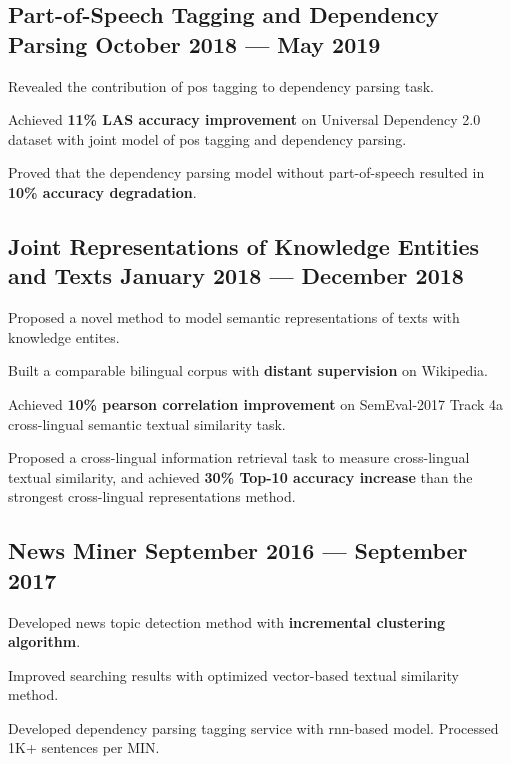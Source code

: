 \subsection*{Part-of-Speech Tagging and Dependency Parsing \hfill October 2018 --- May 2019} 
    \begin{zitemize}
        \item Revealed the contribution of pos tagging to dependency parsing task.
        \item Achieved \textbf{11\% LAS accuracy improvement} on Universal Dependency 2.0 dataset with joint model of pos tagging and dependency parsing.
        \item Proved that the dependency parsing model without part-of-speech resulted in \textbf{10\% accuracy degradation}.
    \end{zitemize}


\subsection*{Joint Representations of Knowledge Entities and Texts \hfill January 2018 --- December 2018} 
    \begin{zitemize}
        \item Proposed a novel method to model semantic representations of texts with knowledge entites.
        \item Built a comparable bilingual corpus with \textbf{distant supervision} on Wikipedia.
        \item Achieved \textbf{10\% pearson correlation improvement} on SemEval-2017 Track 4a cross-lingual semantic textual similarity task.
        \item Proposed a cross-lingual information retrieval task to measure cross-lingual textual similarity, and achieved \textbf{30\% Top-10 accuracy increase} than the strongest cross-lingual representations method.
    \end{zitemize}


\subsection*{News Miner \hfill September 2016 --- September 2017} 
    \begin{zitemize}
        \item Developed news topic detection method with \textbf{incremental clustering algorithm}.
        \item Improved searching results with optimized vector-based textual similarity method.
        \item Developed dependency parsing tagging service with rnn-based model. Processed 1K+ sentences per MIN.
    \end{zitemize}
